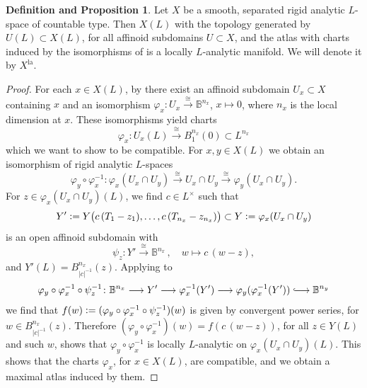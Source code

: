 \documentclass[a4paper, reqno, 10pt]{amsart}
\theoremstyle{definition}
\newtheorem{definitionproposition}[theorem]{Definition and Proposition}
\numberwithin{equation}{section}
\newcommand{\abs}[1]{{\lvert{#1}\rvert}}
\newcommand{\defeq}{\vcentcolon=}
\newcommand{\la}{{\mathrm{la}}}
\newcommand{\lra}{\longrightarrow}
\newcommand{\lto}{\longmapsto}
\newcommand{\mto}{\mapsto}
\newcommand{\unts}{^{\times}}
\newcommand{\BB}{{\mathbb {B}}}
\DeclareRobustCommand\longhookrightarrow
{\lhook\joinrel\longrightarrow}
\begin{document}
\begin{definitionproposition}
	Let $X$ be a smooth, separated rigid analytic $L$-space of countable type.
	Then $X(L)$ with the topology generated by $U(L)\subset X(L)$, for all affinoid subdomains $U\subset X$, and the atlas with charts induced by the isomorphisms of  is a locally $L$-analytic manifold.
	We will denote it by $X^\la$.
\end{definitionproposition}
\begin{proof}
	For each $x\in X(L)$, by  there exist an affinoid subdomain $U_x \subset X$ containing $x$ and an isomorphism $\varphi_x \colon U_x \xrightarrow{\cong} \BB^{n_x}$, $x \mto 0$, where $n_x$ is the local dimension at $x$.
	These isomorphisms yield charts
	\begin{equation*}
		\varphi_x \colon U_x(L) \overset{\cong}{\lra} B_1^{n_x} (0) \subset L^{n_x}
	\end{equation*}
	which we want to show to be compatible.
	For $x,y\in X(L)$ we obtain an isomorphism of rigid analytic $L$-spaces
	\begin{equation*}
		\varphi_y \circ \varphi_x^{-1} \colon \varphi_x (U_x \cap U_y) \overset{\cong}{\lra} U_x \cap U_y \overset{\cong}{\lra } \varphi_y (U_x \cap U_y) .
	\end{equation*}
	For $z \in \varphi_x (U_x \cap U_y)(L)$, we find $c\in L\unts$ such that
	\[Y'\defeq Y\big(c\,(T_1 -z_1),\ldots,c\,(T_{n_x}-z_{n_x}) \big) \subset Y \defeq \varphi_x (U_x \cap U_y) \]
	is an open affinoid subdomain with 
	\begin{equation*}
		\psi_z \colon Y' \overset{\cong}{\lra} \BB^{n_x} \,,\quad w \lto c\,(w-z),
	\end{equation*}
	and $Y'(L) = B_{\abs{c}^{-1}}^{n_x} (z)$.
	Applying  to
	\begin{equation*}
		\varphi_y \circ \varphi^{-1}_x \circ \psi^{-1}_z \colon \BB^{n_x} \lra Y' \lra \varphi_x^{-1}(Y') \lra \varphi_y ( \varphi_x^{-1}(Y')) \longhookrightarrow \BB^{n_y}
	\end{equation*}
	we find that $f(w) \defeq (\varphi_y \circ \varphi^{-1}_x \circ \psi^{-1}_z)(w)$ is given by convergent power series, for $w\in B_{\abs{c}^{-1}}^{n_x}(z)$.
	Therefore $(\varphi_y \circ \varphi_x^{-1})(w) = f(c\,(w-z))$, for all $z \in Y(L)$ and such $w$, shows that $\varphi_y \circ \varphi_x^{-1}$ is locally $L$-analytic on $\varphi_x (U_x \cap U_y)(L)$.
	This shows that the charts $\varphi_x$, for $x\in X(L)$, are compatible, and we obtain a maximal atlas induced by them.
	

\end{proof}
\end{document}

